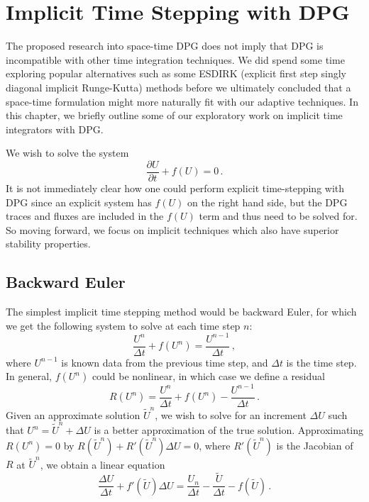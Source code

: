 \documentclass[Proposal.tex]{subfiles}
\begin{document}
\chapter{Implicit Time Stepping with DPG}
The proposed research into space-time DPG does not imply that DPG is incompatible with other time integration techniques. 
We did spend some time exploring popular alternatives such as some ESDIRK (explicit first step singly diagonal implicit Runge-Kutta) methods 
before we ultimately concluded that a space-time formulation might more naturally fit with our adaptive techniques.
In this chapter, we briefly outline some of our exploratory work on implicit time integrators with DPG.


We wish to solve the system
\[
\frac{\partial U}{\partial t}+f(U)=0\,.
\]
It is not immediately clear how one could perform explicit time-stepping with DPG since an explicit system has 
$f(U)$ on the right hand side, but the DPG traces and fluxes are included in the $f(U)$ term and thus need to be solved for.
So moving forward, we focus on implicit techniques which also have superior stability properties.

\section{Backward Euler}
The simplest implicit time stepping method would be backward Euler, for which we get the following system to solve at each time step $n$:
\begin{equation}
	\frac{U^{n}}{\Delta t}+f(U^{n})=\frac{U^{n-1}}{\Delta t}\,,
\end{equation}
where $U^{n-1}$ is known data from the previous time step, and $\Delta t$ is the time step. 
In general, $f(U^n)$ could be nonlinear, in which case we define a residual
\begin{equation}
	R(U^n)=\frac{U^n}{\Delta t}+f(U^n)-\frac{U^{n-1}}{\Delta t}\,.
\end{equation}
Given an approximate solution $\tilde U^n$, we wish to solve for an increment $\Delta U$ such that $U^n=\tilde U^n+\Delta U$ is a better approximation of the true solution.
Approximating $R(U^n)=0$ by $R(\tilde U^n)+R'(\tilde U^n)\Delta U=0$, where $R'(\tilde U^n)$ is the Jacobian of $R$ at $\tilde U^n$, we obtain a linear equation
\begin{equation}
\frac{\Delta U}{\Delta t}+f'(\tilde U)\Delta U
=\frac{U_n}{\Delta t}-\frac{\tilde U}{\Delta t}
-f(\tilde U)\,.
\end{equation}
\end{document}
